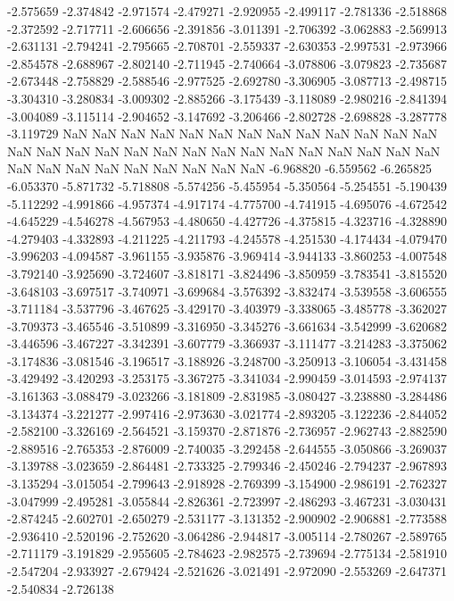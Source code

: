 -2.575659
-2.374842
-2.971574
-2.479271
-2.920955
-2.499117
-2.781336
-2.518868
-2.372592
-2.717711
-2.606656
-2.391856
-3.011391
-2.706392
-3.062883
-2.569913
-2.631131
-2.794241
-2.795665
-2.708701
-2.559337
-2.630353
-2.997531
-2.973966
-2.854578
-2.688967
-2.802140
-2.711945
-2.740664
-3.078806
-3.079823
-2.735687
-2.673448
-2.758829
-2.588546
-2.977525
-2.692780
-3.306905
-3.087713
-2.498715
-3.304310
-3.280834
-3.009302
-2.885266
-3.175439
-3.118089
-2.980216
-2.841394
-3.004089
-3.115114
-2.904652
-3.147692
-3.206466
-2.802728
-2.698828
-3.287778
-3.119729
NaN
NaN
NaN
NaN
NaN
NaN
NaN
NaN
NaN
NaN
NaN
NaN
NaN
NaN
NaN
NaN
NaN
NaN
NaN
NaN
NaN
NaN
NaN
NaN
NaN
NaN
NaN
NaN
NaN
NaN
NaN
NaN
NaN
NaN
NaN
NaN
NaN
-6.968820
-6.559562
-6.265825
-6.053370
-5.871732
-5.718808
-5.574256
-5.455954
-5.350564
-5.254551
-5.190439
-5.112292
-4.991866
-4.957374
-4.917174
-4.775700
-4.741915
-4.695076
-4.672542
-4.645229
-4.546278
-4.567953
-4.480650
-4.427726
-4.375815
-4.323716
-4.328890
-4.279403
-4.332893
-4.211225
-4.211793
-4.245578
-4.251530
-4.174434
-4.079470
-3.996203
-4.094587
-3.961155
-3.935876
-3.969414
-3.944133
-3.860253
-4.007548
-3.792140
-3.925690
-3.724607
-3.818171
-3.824496
-3.850959
-3.783541
-3.815520
-3.648103
-3.697517
-3.740971
-3.699684
-3.576392
-3.832474
-3.539558
-3.606555
-3.711184
-3.537796
-3.467625
-3.429170
-3.403979
-3.338065
-3.485778
-3.362027
-3.709373
-3.465546
-3.510899
-3.316950
-3.345276
-3.661634
-3.542999
-3.620682
-3.446596
-3.467227
-3.342391
-3.607779
-3.366937
-3.111477
-3.214283
-3.375062
-3.174836
-3.081546
-3.196517
-3.188926
-3.248700
-3.250913
-3.106054
-3.431458
-3.429492
-3.420293
-3.253175
-3.367275
-3.341034
-2.990459
-3.014593
-2.974137
-3.161363
-3.088479
-3.023266
-3.181809
-2.831985
-3.080427
-3.238880
-3.284486
-3.134374
-3.221277
-2.997416
-2.973630
-3.021774
-2.893205
-3.122236
-2.844052
-2.582100
-3.326169
-2.564521
-3.159370
-2.871876
-2.736957
-2.962743
-2.882590
-2.889516
-2.765353
-2.876009
-2.740035
-3.292458
-2.644555
-3.050866
-3.269037
-3.139788
-3.023659
-2.864481
-2.733325
-2.799346
-2.450246
-2.794237
-2.967893
-3.135294
-3.015054
-2.799643
-2.918928
-2.769399
-3.154900
-2.986191
-2.762327
-3.047999
-2.495281
-3.055844
-2.826361
-2.723997
-2.486293
-3.467231
-3.030431
-2.874245
-2.602701
-2.650279
-2.531177
-3.131352
-2.900902
-2.906881
-2.773588
-2.936410
-2.520196
-2.752620
-3.064286
-2.944817
-3.005114
-2.780267
-2.589765
-2.711179
-3.191829
-2.955605
-2.784623
-2.982575
-2.739694
-2.775134
-2.581910
-2.547204
-2.933927
-2.679424
-2.521626
-3.021491
-2.972090
-2.553269
-2.647371
-2.540834
-2.726138
